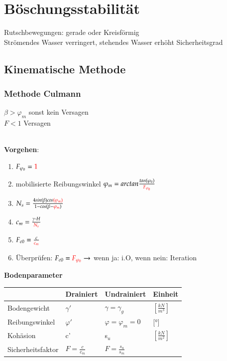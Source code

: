 \section{Böschungsstabilität}

Rutschbewegungen: gerade oder Kreisförmig \\
Strömendes Wasser verringert, stehendes Wasser erhöht Sicherheitsgrad
\subsection{Kinematische Methode}
\subsubsection{Methode Culmann}
$ \beta > \varphi_m $ sonst kein Versagen \\
$ F < 1 $ Versagen \\
\\
\begin{minipage}{0.55\linewidth}
		\textbf{Vorgehen}:
		\begin{enumerate}
			\item $ F_{\varphi_0} = \textcolor{red}{1} $
			\item mobilisierte Reibungswinkel $ \varphi_m = arctan \frac{tan (\varphi_0)}{\textcolor{red}{F_{\varphi_0}}} $
			\item $ N_s = \frac{4 sin (\beta) cos \textcolor{red}{(\varphi_m)}}{1 - cos (\beta - \textcolor{red}{\varphi_m})} $
			\item $ c_m = \frac{\gamma \cdot H}{\textcolor{red}{N_s}} $
			\item $ F_{c0} = \frac{c}{\textcolor{red}{c_m}} $
			\item Überprüfen: $ F_{c0} = \textcolor{red}{F_{\varphi_0}} \rightarrow $ wenn ja: i.O, wenn nein: Iteration
		\end{enumerate}
\end{minipage}
\begin{minipage}{0.5\linewidth}
	\textbf{Bodenparameter} \\
	\begin{tabular}{l|l|l|l}
					&	Drainiert			& Undrainiert			& Einheit \\ \hline
		
	Bodengewicht	&	$ \gamma' $			& $ \gamma = \gamma_g $ & $ [\frac{kN}{m^3}] $ \\
	Reibungswinkel	&	$ \varphi' $		& $ \varphi = \varphi_m = 0  $			& [°] \\
	Kohäsion		& c'					&  s$_u $				& $[ \frac{kN}{m^2} ]$ \\
	Sicherheitsfaktor & $ F=\frac{c}{c_m} $	& $ F=\frac{s_u}{s_m} $	& \\
	
	\end{tabular}
\end{minipage}


